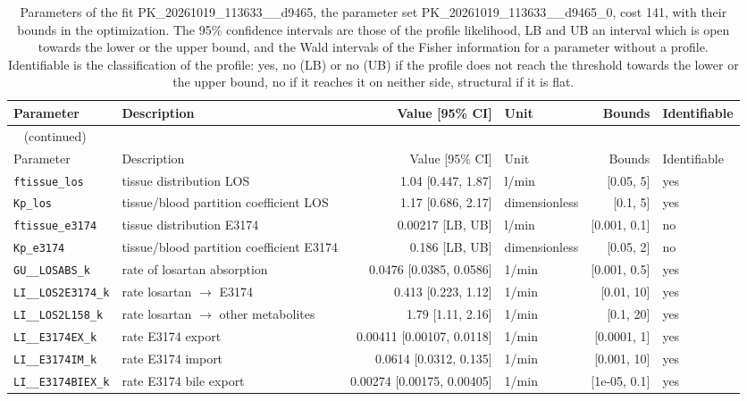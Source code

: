 \begin{longtable}{llrlrl}
\caption{Parameters of the fit PK\_20261019\_113633\_\_d9465, the parameter set PK\_20261019\_113633\_\_d9465\_0, cost 141, with their bounds in the optimization. The 95\% confidence intervals are those of the profile likelihood, LB and UB an interval which is open towards the lower or the upper bound, and the Wald intervals of the Fisher information for a parameter without a profile. Identifiable is the classification of the profile: yes, no (LB) or no (UB) if the profile does not reach the threshold towards the lower or the upper bound, no if it reaches it on neither side, structural if it is flat.}\label{tab:parameters:PK_20261019_113633__d9465} \\
\toprule
Parameter & Description & Value [95\% CI] & Unit & Bounds & Identifiable \\
\midrule
\endfirsthead
\multicolumn{6}{l}{\small\tablename~\thetable{} (continued)} \\
\toprule
Parameter & Description & Value [95\% CI] & Unit & Bounds & Identifiable \\
\midrule
\endhead
\bottomrule
\endlastfoot
\texttt{ftissue\_los} & tissue distribution LOS & 1.04 [0.447, 1.87] & l/min & [0.05, 5] & yes \\
\texttt{Kp\_los} & tissue/blood partition coefficient LOS & 1.17 [0.686, 2.17] & dimensionless & [0.1, 5] & yes \\
\texttt{ftissue\_e3174} & tissue distribution E3174 & 0.00217 [LB, UB] & l/min & [0.001, 0.1] & no \\
\texttt{Kp\_e3174} & tissue/blood partition coefficient E3174 & 0.186 [LB, UB] & dimensionless & [0.05, 2] & no \\
\texttt{GU\_\_LOSABS\_k} & rate of losartan absorption & 0.0476 [0.0385, 0.0586] & 1/min & [0.001, 0.5] & yes \\
\texttt{LI\_\_LOS2E3174\_k} & rate losartan \ensuremath{\rightarrow} E3174 & 0.413 [0.223, 1.12] & 1/min & [0.01, 10] & yes \\
\texttt{LI\_\_LOS2L158\_k} & rate losartan \ensuremath{\rightarrow} other metabolites & 1.79 [1.11, 2.16] & 1/min & [0.1, 20] & yes \\
\texttt{LI\_\_E3174EX\_k} & rate E3174 export & 0.00411 [0.00107, 0.0118] & 1/min & [0.0001, 1] & yes \\
\texttt{LI\_\_E3174IM\_k} & rate E3174 import & 0.0614 [0.0312, 0.135] & 1/min & [0.001, 10] & yes \\
\texttt{LI\_\_E3174BIEX\_k} & rate E3174 bile export & 0.00274 [0.00175, 0.00405] & 1/min & [1e-05, 0.1] & yes \\

\end{longtable}
